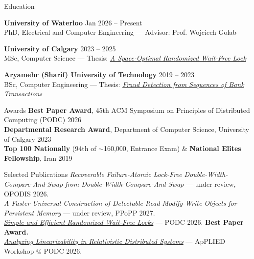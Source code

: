 \documentclass{resume}
\begin{document}
\begin{rSection}{Education}

{\bf University of Waterloo} \hfill {Jan 2026 -- Present} \\
PhD, Electrical and Computer Engineering --- Advisor: Prof. Wojciech Golab

{\bf University of Calgary} \hfill {2023 -- 2025} \\
MSc, Computer Science --- Thesis: \textit{\href{https://ucalgary.scholaris.ca/bitstreams/5ae5cf8f-5009-4db3-b91e-d3dbb679b5bf/download}{A Space-Optimal Randomized Wait-Free Lock}}

{\bf Aryamehr (Sharif) University of Technology} \hfill {2019 -- 2023} \\
BSc, Computer Engineering --- Thesis: \textit{\href{https://github.com/kahbodaeini/Fraud-Detection}{Fraud Detection from Sequences of Bank Transactions}}

\end{rSection}

\begin{rSection}{Awards}
\textbf{Best Paper Award}, 45th ACM Symposium on Principles of Distributed Computing (PODC) \hfill {2026} \\
\textbf{Departmental Research Award}, Department of Computer Science, University of Calgary \hfill {2023} \\
\textbf{Top 100 Nationally} (94th of $\sim$160,000, Entrance Exam) \& \textbf{National Elites Fellowship}, Iran \hfill {2019}
\end{rSection}

\begin{rSection}{Selected Publications}
\textit{Recoverable Failure-Atomic Lock-Free Double-Width-Compare-And-Swap from Double-Width-Compare-And-Swap} --- under review, OPODIS 2026. \\
\textit{A Faster Universal Construction of Detectable Read-Modify-Write Objects for Persistent Memory} --- under review, PPoPP 2027. \\
\textit{\href{https://dl.acm.org/doi/10.1145/3796701.3815952}{Simple and Efficient Randomized Wait-Free Locks}} --- PODC 2026. \textbf{Best Paper Award.} \\
\textit{\href{https://dl.acm.org/doi/10.1145/3820355.3820388}{Analyzing Linearizability in Relativistic Distributed Systems}} --- ApPLIED Workshop @ PODC 2026.
\end{rSection}
\end{document}
